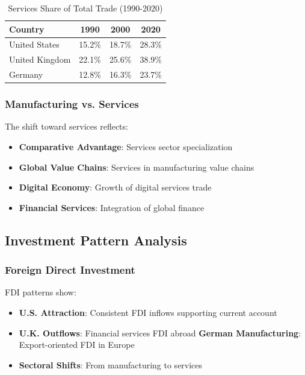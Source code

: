 \documentclass[11pt,a4paper]{article}
\begin{document}
\begin{table}[h]
\centering
\caption{Services Share of Total Trade (1990-2020)}
\begin{tabular}{lccc}
\toprule
\textbf{Country} & \textbf{1990} & \textbf{2000} & \textbf{2020} \\
\midrule
United States & 15.2\% & 18.7\% & 28.3\% \\
United Kingdom & 22.1\% & 25.6\% & 38.9\% \\
Germany & 12.8\% & 16.3\% & 23.7\% \\
\bottomrule
\end{tabular}
\end{table}

\subsubsection{Manufacturing vs. Services}
The shift toward services reflects:

\begin{itemize}
    \item \textbf{Comparative Advantage}: Services sector specialization
    \item \textbf{Global Value Chains}: Services in manufacturing value chains
    \item \textbf{Digital Economy}: Growth of digital services trade
    \item \textbf{Financial Services}: Integration of global finance
\end{itemize}

\subsection{Investment Pattern Analysis}

\subsubsection{Foreign Direct Investment}
FDI patterns show:

\begin{itemize}
    \item \textbf{U.S. Attraction}: Consistent FDI inflows supporting current account
    \item \textbf{U.K. Outflows}: Financial services FDI abroad
    \textbf{German Manufacturing}: Export-oriented FDI in Europe
    \item \textbf{Sectoral Shifts}: From manufacturing to services
\end{itemize}
\end{document}
